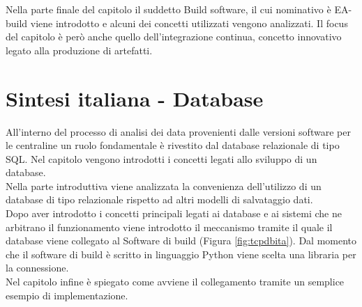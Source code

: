 \documentclass[../main.tex]{subfiles}
\begin{document}
Nella parte finale del capitolo il suddetto Build software, il cui nominativo è EA-build viene introdotto  e alcuni dei concetti utilizzati vengono analizzati. Il focus del capitolo è però anche quello dell'integrazione continua, concetto innovativo legato alla produzione di artefatti. 
\section{Sintesi italiana - Database}
All'interno del processo di analisi dei data provenienti dalle versioni software per le centraline un ruolo fondamentale è rivestito dal database relazionale di tipo \gls{SQL}. Nel capitolo vengono introdotti i concetti legati allo sviluppo di un database.\\
Nella parte introduttiva viene analizzata la convenienza dell'utilizzo di un database di tipo relazionale rispetto ad altri modelli di salvataggio dati. \\
Dopo aver introdotto i concetti principali legati ai database e ai sistemi che ne arbitrano il funzionamento viene introdotto il meccanismo tramite il quale il database viene collegato al Software di build (Figura \ref{fig:tcpdbita}). Dal momento che il software di build è scritto in linguaggio Python viene scelta una libraria per la connessione.\\
Nel capitolo infine è spiegato come avviene il collegamento tramite un semplice esempio di implementazione. 
\end{document}
